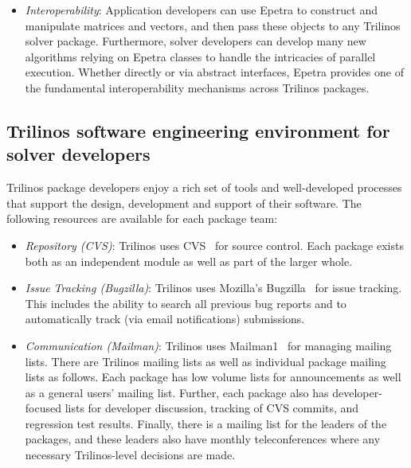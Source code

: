 \documentclass[]{llncs}      %
\begin{document}
\begin{itemize}
(DistObject) base class that manages global distributed objects.  Not
only does this base class provide the functionality for common
distributed objects like matrices and vectors, it also supports
distributed graphs, block matrices, and coloring objects.  Furthermore,
any class can derive from DistObject by implementing just a few simple
methods to pack and unpack data.  
\item {\sl Interoperability}: Application
developers can use Epetra to construct and manipulate matrices and
vectors, and then pass these objects to any Trilinos solver
package. Furthermore, solver developers can develop many new algorithms
relying on Epetra classes to handle the intricacies of parallel
execution.  Whether directly or via abstract interfaces, Epetra provides
one of the fundamental interoperability mechanisms across Trilinos
packages.  
\end{itemize}


\subsection*{Trilinos software engineering environment for solver
developers}

Trilinos package developers enjoy a rich set of tools and
well-developed processes that support the design, development and
support of their software.  The following resources are available for
each package team: 
\begin{itemize}
\item {\sl Repository (CVS)}: Trilinos uses CVS~\cite{11} for
source control.  Each package exists both as an independent module as
well as part of the larger whole. 
\item {\sl Issue Tracking (Bugzilla)}:  Trilinos
uses Mozilla’s Bugzilla~\cite{12} for issue tracking.  This includes the
ability to search all previous bug reports and to automatically track
(via email notifications) submissions.  
\item {\sl Communication (Mailman)}:
Trilinos uses Mailman1~\cite{3} for managing mailing lists.  There are
Trilinos mailing lists as well as individual package mailing lists as
follows. Each package has low volume lists for announcements as well as
a general users’ mailing list. Further, each package also has
developer-focused lists for developer discussion, tracking of CVS
commits, and regression test results. Finally, there is a mailing list
for the leaders of the packages, and these leaders also have monthly
teleconferences where any necessary Trilinos-level decisions are made.
\end{itemize}
\end{document}
